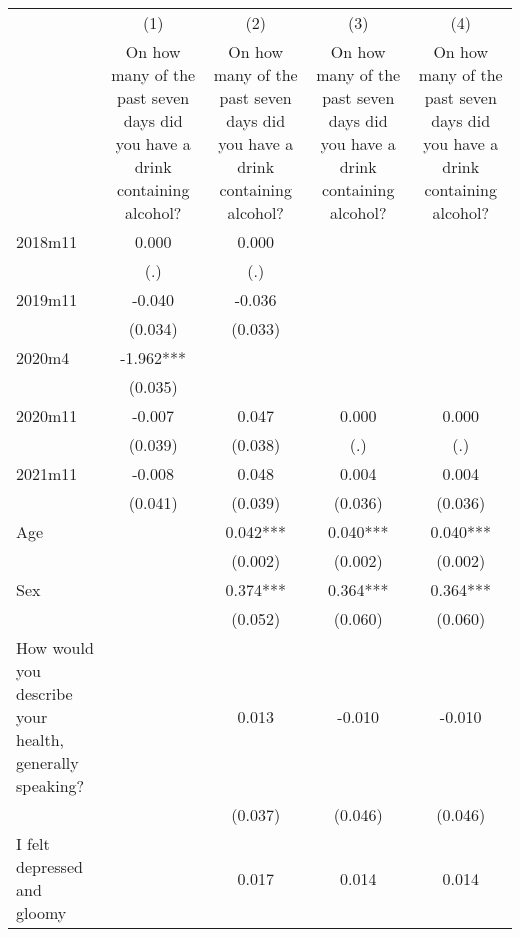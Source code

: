 {
\def\sym#1{\ifmmode^{#1}\else\(^{#1}\)\fi}
\begin{tabular}{l*{4}{c}}
\hline\hline
                &\multicolumn{1}{c}{(1)}&\multicolumn{1}{c}{(2)}&\multicolumn{1}{c}{(3)}&\multicolumn{1}{c}{(4)}\\
                &\multicolumn{1}{c}{On how many of the past seven days did you have a drink containing alcohol?}&\multicolumn{1}{c}{On how many of the past seven days did you have a drink containing alcohol?}&\multicolumn{1}{c}{On how many of the past seven days did you have a drink containing alcohol?}&\multicolumn{1}{c}{On how many of the past seven days did you have a drink containing alcohol?}\\
\hline
2018m11         &    0.000   &    0.000   &            &            \\
                &      (.)   &      (.)   &            &            \\
[1em]
2019m11         &   -0.040   &   -0.036   &            &            \\
                &  (0.034)   &  (0.033)   &            &            \\
[1em]
 2020m4         &   -1.962***&            &            &            \\
                &  (0.035)   &            &            &            \\
[1em]
2020m11         &   -0.007   &    0.047   &    0.000   &    0.000   \\
                &  (0.039)   &  (0.038)   &      (.)   &      (.)   \\
[1em]
2021m11         &   -0.008   &    0.048   &    0.004   &    0.004   \\
                &  (0.041)   &  (0.039)   &  (0.036)   &  (0.036)   \\
[1em]
Age             &            &    0.042***&    0.040***&    0.040***\\
                &            &  (0.002)   &  (0.002)   &  (0.002)   \\
[1em]
Sex             &            &    0.374***&    0.364***&    0.364***\\
                &            &  (0.052)   &  (0.060)   &  (0.060)   \\
[1em]
How would you describe your health, generally speaking?&            &    0.013   &   -0.010   &   -0.010   \\
                &            &  (0.037)   &  (0.046)   &  (0.046)   \\
[1em]
I felt depressed and gloomy&            &    0.017   &    0.014   &    0.014   \\

\end{tabular}}
